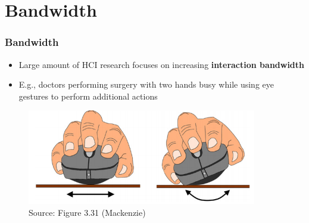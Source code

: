 \documentclass{beamer}
\begin{document}


\section{Bandwidth}

\begin{frame}
	\frametitle{Bandwidth}
	\begin{itemize}
		\item Large amount of HCI research focuses on increasing \textbf{interaction bandwidth}%
		\item E.g., doctors performing surgery with two hands busy while using eye gestures to perform additional actions
	\end{itemize}
	\begin{figure}
		\includegraphics[width=0.7\linewidth]{image/3-31}
		\caption{Source: Figure 3.31 (Mackenzie)}
	\end{figure}
\end{frame}
\end{document}
